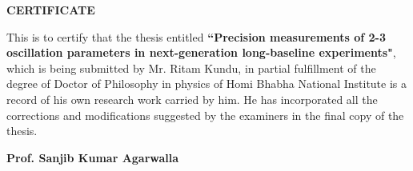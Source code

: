 \begin{center}
\large \bf
CERTIFICATE
\end{center}
This is to certify that the thesis entitled {\bf ``Precision measurements of 2-3 oscillation parameters in next-generation long-baseline experiments"}, which
is being submitted by Mr. Ritam Kundu, in partial fulfillment of the degree of Doctor
of Philosophy in physics of Homi Bhabha National Institute is a record of his own research
work carried by him. He has incorporated all the corrections and modifications suggested
by the examiners in the final copy of the thesis.
\vspace{1.2cm}
\begin{flushright}
	\textbf{Prof. Sanjib Kumar Agarwalla}
\end{flushright}
\hspace{12cm}{\bf(Guide)}
